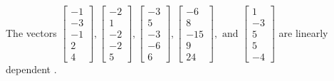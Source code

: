 \begin{exercise}
\begin{exerciseStatement}
  \end{exerciseStatement}
  \begin{exerciseAnswer}
   The vectors \(\left[\begin{array}{r}
-1 \\
-3 \\
-1 \\
2 \\
4
\end{array}\right] , \left[\begin{array}{r}
-2 \\
1 \\
-2 \\
-2 \\
5
\end{array}\right] , \left[\begin{array}{r}
-3 \\
5 \\
-3 \\
-6 \\
6
\end{array}\right] , \left[\begin{array}{r}
-6 \\
8 \\
-15 \\
9 \\
24
\end{array}\right] , \text{ and } \left[\begin{array}{r}
1 \\
-3 \\
5 \\
5 \\
-4
\end{array}\right]\) are 
  	 linearly dependent  .
  


  \end{exerciseAnswer}
\end{exercise}